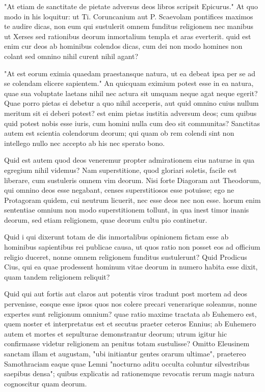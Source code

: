  "At etiam de sanctitate de pietate adversus deos libros scripsit Epicurus." At quo modo in his loquitur: ut Ti. Coruncanium aut P. Scaevolam pontifices maximos te audire dicas, non eum qui sustulerit omnem funditus religionem nec manibus ut Xerses sed rationibus deorum inmortalium templa et aras everterit. quid est enim cur deos ab hominibus colendos dicas, cum dei non modo homines non colant sed omnino nihil curent nihil agant?

 "At est eorum eximia quaedam praestansque natura, ut ea debeat ipsa per se ad se colendam elicere sapientem." An quicquam eximium potest esse in ea natura, quae sua voluptate laetans nihil nec actura sit umquam neque agat neque egerit? Quae porro pietas ei debetur a quo nihil acceperis, aut quid omnino cuius nullum meritum sit ei deberi potest? est enim pietas iustitia adversum deos; cum quibus quid potest nobis esse iuris, cum homini nulla cum deo sit communitas? Sanctitas autem est scientia colendorum deorum; qui quam ob rem colendi sint non intellego nullo nec accepto ab his nec sperato bono.

 Quid est autem quod deos veneremur propter admirationem eius naturae in qua egregium nihil videmus? Nam superstitione, quod gloriari soletis, facile est liberare, cum sustuleris omnem vim deorum. Nisi forte Diagoram aut Theodorum, qui omnino deos esse negabant, censes superstitiosos esse potuisse; ego ne Protagoram quidem, cui neutrum licuerit, nec esse deos nec non esse. horum enim sententiae omnium non modo superstitionem tollunt, in qua inest timor inanis deorum, sed etiam religionem, quae deorum cultu pio continetur.

 Quid i qui dixerunt totam de dis inmortalibus opinionem fictam esse ab hominibus sapientibus rei publicae causa, ut quos ratio non posset eos ad officium religio duceret, nonne omnem religionem funditus sustulerunt? Quid Prodicus Cius, qui ea quae prodessent hominum vitae deorum in numero habita esse dixit, quam tandem religionem reliquit?

 Quid qui aut fortis aut claros aut potentis viros tradunt post mortem ad deos pervenisse, eosque esse ipsos quos nos colere precari venerarique soleamus, nonne expertes sunt religionum omnium? quae ratio maxime tractata ab Euhemero est, quem noster et interpretatus est et secutus praeter ceteros Ennius; ab Euhemero autem et mortes et sepulturae demonstrantur deorum; utrum igitur hic confirmasse videtur religionem an penitus totam sustulisse? Omitto Eleusinem sanctam illam et augustam, "ubi initiantur gentes orarum ultimae", praetereo Samothraciam eaque quae Lemni "nocturno aditu occulta coluntur silvestribus saepibus densa"; quibus explicatis ad rationemque revocatis rerum magis natura cognoscitur quam deorum.

